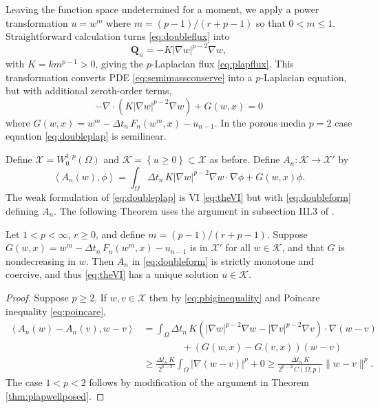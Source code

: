 \documentclass[final,onefignum]{siamart190516}
\newcommand\bQ{\mathbf{Q}}
\newcommand{\Div}{\nabla\cdot}
\newcommand{\grad}{\nabla}
\newcommand{\ip}[2]{\ensuremath{\left<#1,#2\right>}}
\begin{document}
Leaving the function space undetermined for a moment, we apply a power transformation $u = w^m$ where $m = (p-1)/(r+p-1)$ \cite{Raviart1970} so that $0 < m \le 1$.  Straightforward calculation turns \eqref{eq:doubleflux} into
\begin{equation}
	\bQ_n = - K |\grad w|^{p-2} \grad w, \label{eq:doublenewflux}
\end{equation}
with $K=k m^{p-1}>0$, giving the $p$-Laplacian flux \eqref{eq:plapflux}.  This transformation converts PDE \eqref{eq:semimassconserve} into a $p$-Laplacian equation, but with additional zeroth-order terms,
\begin{equation}
    - \Div\left(K|\grad w|^{p-2} \grad w\right) + G(w,x) = 0  \label{eq:doubleplap}
\end{equation}
where $G(w,x) = w^m - \Delta t_n\, F_n(w^m,x) - u_{n-1}$.  In the porous media $p=2$ case equation \eqref{eq:doubleplap} is semilinear.

Define $\mathcal{X} = W_0^{1,p}(\Omega)$ and $\mathcal{K} =\left\{u\ge 0\right\} \subset \mathcal{X}$ as before.  Define $A_n: \mathcal{K} \to \mathcal{X}'$ by
\begin{equation}
\ip{A_n(w)}{\phi} = \int_\Omega \Delta t_n\, K |\grad w|^{p-2} \grad w\cdot \grad \phi + G(w,x)\phi. \label{eq:doubleform}
\end{equation}
The weak formulation of \eqref{eq:doubleplap} is VI \eqref{eq:theVI} but with \eqref{eq:doubleform} defining $A_n$.  The following Theorem uses the argument in subsection III.3 of \cite{KinderlehrerStampacchia1980}.

\begin{theorem}
Let $1<p<\infty$, $r\ge 0$, and define $m = (p-1)/(r+p-1)$.  Suppose $G(w,x)=w^m - \Delta t_n\, F_n(w^m,x) - u_{n-1}$ is in $\mathcal{X}'$ for all $w\in\mathcal{K}$, and that $G$ is nondecreasing in $w$.  Then $A_n$ in \eqref{eq:doubleform} is strictly monotone and coercive, and thus \eqref{eq:theVI} has a unique solution $u\in\mathcal{K}$.
\end{theorem}

\begin{proof}
Suppose $p\ge 2$.  If $w,v\in\mathcal{X}$ then by \eqref{eq:pbiginequality} and Poincare inequality \eqref{eq:poincare},
\begin{align*}
\ip{A_n(w)-A_n(v)}{w-v} &= \int_\Omega \Delta t_n\, K \left(|\grad w|^{p-2} \grad w - |\grad v|^{p-2} \grad v\right) \cdot \grad (w-v) \\
  &\qquad\qquad + \left(G(w,x) - G(v,x)\right) (w-v) \\
  &\ge \frac{\Delta t_n\,K}{2^{p-2}} \int_\Omega |\grad (w-v)|^p + 0 \ge \frac{\Delta t_n\,K}{2^{p-2}\, C(\Omega,p)} \|w-v\|^p.
\end{align*}
The case $1<p<2$ follows by modification of the argument in Theorem \ref{thm:plapwellposed}.
\end{proof}
\end{document}
